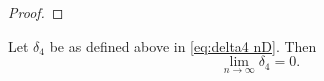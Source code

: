 \begin{proof}


	\end{proof}

	\begin{lemma}
	\label{lem:delta4 goes to 0 general}
		Let $\delta_4$ be as defined above in \eqref{eq:delta4 nD}. Then
		\begin{equation}
			\lim_{n\rightarrow\infty} \delta_4 = 0.
		\end{equation}
	\end{lemma}
